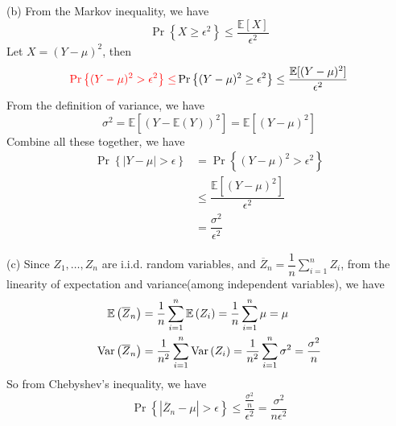 (b) From the Markov inequality, we have
$$\Pr\left\{X\geq \epsilon^2\right\}\leq\dfrac{\mathbb{E}[X]}{\epsilon^2}$$
Let $X=(Y-\mu)^2$, then
$$\textcolor{red}{\Pr\left\{(Y-\mu)^2> \epsilon^2\right\}\leq} \Pr\left\{(Y-\mu)^2\geq \epsilon^2\right\}\leq\dfrac{\mathbb{E}[(Y-\mu)^2]}{\epsilon^2}$$
From the definition of variance, we have
$$\sigma^2=\mathbb{E}[(Y-\mathbb{E}(Y))^2]=\mathbb{E}[(Y-\mu)^2]$$
Combine all these together, we have
\begin{align*}
\Pr\left\{|Y-\mu|>\epsilon\right\} &= \Pr\left\{(Y-\mu)^2>\epsilon^2\right\} \\
&\leq \dfrac{\mathbb{E}[(Y-\mu)^2]}{\epsilon^2} \\
&= \dfrac{\sigma^2}{\epsilon^2}
\end{align*}

(c) Since $Z_1,\ldots,Z_n$ are i.i.d. random variables, and $\overline{Z}_n=\dfrac1n\sum\limits_{i=1}^nZ_i$, from the linearity of expectation and variance(among independent variables), we have
\begin{align*}
\mathbb{E}\left(\overline{Z}_n\right) &= \dfrac{1}{n}\sum\limits_{i=1}^n\mathbb{E}\left(Z_i\right) = \dfrac{1}{n}\sum\limits_{i=1}^n\mu = \mu \\
\mathrm{Var}\left(\overline{Z}_n\right) &= \dfrac{1}{n^2}\sum\limits_{i=1}^n\mathrm{Var}\left(Z_i\right) = \dfrac{1}{n^2}\sum\limits_{i=1}^n\sigma^2 = \dfrac{\sigma^2}{n}
\end{align*}
So from Chebyshev's inequality, we have
$$\Pr\left\{|\overline{Z}_n-\mu|>\epsilon\right\} \leq \dfrac{\frac{\sigma^2}{n}}{\epsilon^2} = \dfrac{\sigma^2}{n\epsilon^2}$$

\newpage